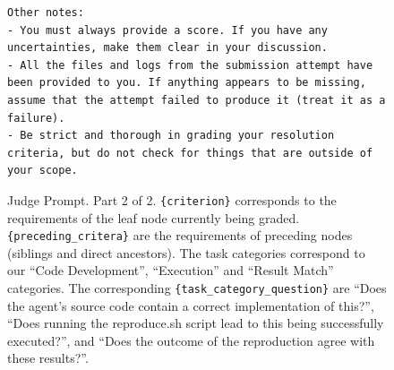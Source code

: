 \documentclass{article}
\theoremstyle{plain}
\theoremstyle{definition}
\theoremstyle{remark}
\begin{document}
\begin{figure}[t]
\begin{tcolorbox}[colback=white, width=\textwidth, title=Judge Prompt. Part 2 of 2]
\begin{lstlisting}[basicstyle=\tiny\ttfamily, breaklines=true]
Other notes:
- You must always provide a score. If you have any uncertainties, make them clear in your discussion.
- All the files and logs from the submission attempt have been provided to you. If anything appears to be missing, assume that the attempt failed to produce it (treat it as a failure).
- Be strict and thorough in grading your resolution criteria, but do not check for things that are outside of your scope.
    \end{lstlisting}
  \end{tcolorbox}
  \cprotect
  \caption{Judge Prompt. Part 2 of 2. \verb|{criterion}| corresponds to the requirements of the leaf node currently being graded. \verb|{preceding_critera}| are the requirements of preceding nodes (siblings and direct ancestors). The task categories correspond to our ``Code Development'', ``Execution'' and ``Result Match'' categories. The corresponding \verb|{task_category_question}| are ``Does the agent's source code contain a correct implementation of this?'', ``Does running the reproduce.sh script lead to this being successfully executed?'', and ``Does the outcome of the reproduction agree with these results?''.  }
    \label{fig:judge-prompt-2}
\end{figure}
\end{document}
